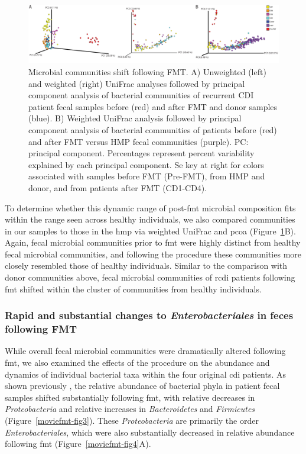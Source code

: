 \begin{figure}
\includegraphics[width=\textheight]{moviefmt-figures/figure-2}
\caption[Microbial communities shift following FMT.]{Microbial communities shift following FMT. A) Unweighted (left) and weighted (right) UniFrac analyses followed by principal component analysis of bacterial communities of recurrent CDI patient fecal samples before (red) and after FMT and donor samples (blue). B) Weighted UniFrac analysis followed by principal component analysis of bacterial communities of patients before (red) and after FMT versus HMP fecal communities (purple). PC: principal component. Percentages represent percent variability explained by each principal component. Se key at right for colors associated with samples before FMT (Pre-FMT), from HMP and donor, and from patients after FMT (CD1-CD4).}
\label{moviefmt-fig2}
\end{figure}

To determine whether this dynamic range of post-\gls{fmt} microbial composition fits within the range seen across healthy individuals, we also compared communities in our samples to those in the \gls{hmp} via weighted UniFrac and \gls{pcoa} (Figure~\ref{moviefmt-fig2}B). Again, fecal microbial communities prior to \gls{fmt} were highly distinct from healthy fecal microbial communities, and following the procedure these communities more closely resembled those of healthy individuals. Similar to the comparison with donor communities above, fecal microbial communities of \gls{rcdi} patients following \gls{fmt} shifted within the cluster of communities from healthy individuals.

\subsubsection{Rapid and substantial changes to \textit{Enterobacteriales} in feces following FMT}

While overall fecal microbial communities were dramatically altered following \gls{fmt}, we also examined the effects of the procedure on the abundance and dynamics of individual bacterial taxa within the four original \gls{cdi} patients. As shown previously \cite{RN53moviefmt, RN30, RN66, RN31, RN36, RN4129, RN1}, the relative abundance of bacterial phyla in patient fecal samples shifted substantially following \gls{fmt}, with relative decreases in \textit{Proteobacteria} and relative increases in \textit{Bacteroidetes} and \textit{Firmicutes} (Figure~\ref{moviefmt-fig3}). These \textit{Proteobacteria} are primarily the order \textit{Enterobacteriales}, which were also substantially decreased in relative abundance following \gls{fmt} (Figure~\ref{moviefmt-fig4}A).

